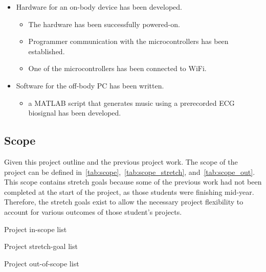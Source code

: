 \begin{itemize}
        \item Hardware for an on-body device has been developed.
        \begin{itemize}
                \item The hardware has been successfully powered-on.
                \item Programmer communication with the microcontrollers has been established.
                \item One of the microcontrollers has been connected to WiFi.
        \end{itemize}
        \item Software for the off-body PC has been written.
        \begin{itemize}
                \item a MATLAB script that generates music using a prerecorded ECG biosignal has been developed.
        \end{itemize}
\end{itemize}

\subsection{Scope}
Given this project outline and the previous project work.
The scope of the project can be defined in~\autoref{tab:scope},~\autoref{tab:scope_stretch}, and~\autoref{tab:scope_out}.
This scope contains stretch goals because some of the previous work had not been completed at the start of the project,
as those students were finishing mid-year.
Therefore, the stretch goals exist to allow the necessary project flexibility to account for various outcomes of those student's projects.

\begin{table}[!ht]
    \caption{Project in-scope list}\label{tab:scope}
    \centering
    
\end{table}

\begin{table}[!ht]
    \caption{Project stretch-goal list}\label{tab:scope_stretch}
    \centering
    
\end{table}

\begin{table}[!ht]
    \caption{Project out-of-scope list}\label{tab:scope_out}
    \centering
    
\end{table}
